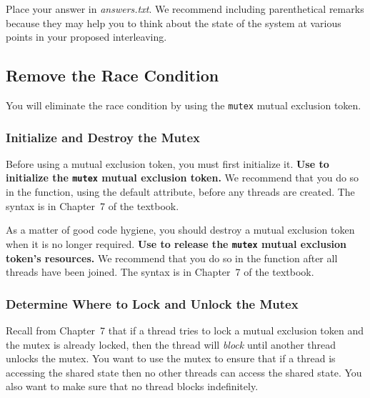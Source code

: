     Place your answer in \textit{answers.txt}.
    We recommend including parenthetical remarks because they may help you to think about the state of the system at various points in your proposed interleaving.

    \subsection{Remove the Race Condition}

    You will eliminate the race condition by using the \lstinline{mutex} mutual exclusion token.

    \subsubsection{Initialize and Destroy the Mutex}

    Before using a mutual exclusion token, you must first initialize it.
    \textbf{Use  to initialize the \lstinline{mutex} mutual exclusion token.}
    We recommend that you do so in the  function, using the default attribute, before any threads are created.
    The syntax is in Chapter~7 of the textbook.

    As a matter of good code hygiene, you should destroy a mutual exclusion token when it is no longer required.
    \textbf{Use  to release the \lstinline{mutex} mutual exclusion token's resources.}
    We recommend that you do so in the  function after all threads have been joined.
    The syntax is in Chapter~7 of the textbook.

    \subsubsection{Determine Where to Lock and Unlock the Mutex} \label{subsubsec:designMutex}

    Recall from Chapter~7 that if a thread tries to lock a mutual exclusion token and the mutex is already locked, then the thread will \textit{block} until another thread unlocks the mutex.
    You want to use the mutex to ensure that if a thread is accessing the shared state then no other threads can access the shared state.
    You also want to make sure that no thread blocks indefinitely.

